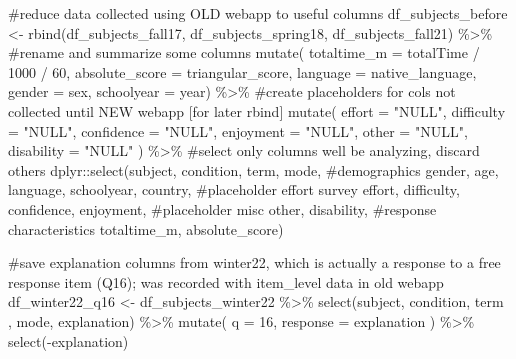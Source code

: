 \documentclass[
  letterpaper,
  DIV=11,
  numbers=noendperiod]{scrreprt}
\newenvironment{Shaded}{\begin{snugshade}}{\end{snugshade}}
\newcommand{\AttributeTok}[1]{\textcolor[rgb]{0.40,0.45,0.13}{#1}}
\newcommand{\CommentTok}[1]{\textcolor[rgb]{0.37,0.37,0.37}{#1}}
\newcommand{\DecValTok}[1]{\textcolor[rgb]{0.68,0.00,0.00}{#1}}
\newcommand{\FunctionTok}[1]{\textcolor[rgb]{0.28,0.35,0.67}{#1}}
\newcommand{\NormalTok}[1]{\textcolor[rgb]{0.00,0.23,0.31}{#1}}
\newcommand{\OtherTok}[1]{\textcolor[rgb]{0.00,0.23,0.31}{#1}}
\newcommand{\SpecialCharTok}[1]{\textcolor[rgb]{0.37,0.37,0.37}{#1}}
\newcommand{\StringTok}[1]{\textcolor[rgb]{0.13,0.47,0.30}{#1}}
\begin{document}
\begin{Shaded}
\begin{Highlighting}[]
\CommentTok{\#reduce data collected using OLD webapp to useful columns}
\NormalTok{df\_subjects\_before }\OtherTok{\textless{}{-}} \FunctionTok{rbind}\NormalTok{(df\_subjects\_fall17, df\_subjects\_spring18, df\_subjects\_fall21) }\SpecialCharTok{\%\textgreater{}\%} 
  \CommentTok{\#rename and summarize some columns}
  \FunctionTok{mutate}\NormalTok{(}
    \AttributeTok{totaltime\_m =}\NormalTok{ totalTime }\SpecialCharTok{/} \DecValTok{1000} \SpecialCharTok{/} \DecValTok{60}\NormalTok{,  }
    \AttributeTok{absolute\_score =}\NormalTok{ triangular\_score,}
    \AttributeTok{language =}\NormalTok{ native\_language,}
    \AttributeTok{gender =}\NormalTok{ sex,}
    \AttributeTok{schoolyear =}\NormalTok{ year) }\SpecialCharTok{\%\textgreater{}\%} 
  \CommentTok{\#create placeholders for cols not collected until NEW webapp [for later rbind]}
  \FunctionTok{mutate}\NormalTok{(}
    \AttributeTok{effort =} \StringTok{"NULL"}\NormalTok{,}
    \AttributeTok{difficulty =} \StringTok{"NULL"}\NormalTok{,}
    \AttributeTok{confidence =} \StringTok{"NULL"}\NormalTok{,}
    \AttributeTok{enjoyment =} \StringTok{"NULL"}\NormalTok{,}
    \AttributeTok{other =} \StringTok{"NULL"}\NormalTok{,}
    \AttributeTok{disability =} \StringTok{"NULL"}
\NormalTok{  ) }\SpecialCharTok{\%\textgreater{}\%} 
  \CommentTok{\#select only columns we\textquotesingle{}ll be analyzing, discard others}
\NormalTok{  dplyr}\SpecialCharTok{::}\FunctionTok{select}\NormalTok{(subject, condition, term, mode, }
                \CommentTok{\#demographics}
\NormalTok{                gender, age, language, schoolyear, country,}
                \CommentTok{\#placeholder effort survey}
\NormalTok{                effort, difficulty, confidence, enjoyment, }
                \CommentTok{\#placeholder misc }
\NormalTok{                other, disability,}
                \CommentTok{\#response characteristics}
\NormalTok{                totaltime\_m, absolute\_score)}

\CommentTok{\#save \textquotesingle{}explanation\textquotesingle{} columns from winter22, which is actually a response to a free response item (Q16); was recorded with item\_level data in old webapp}
\NormalTok{df\_winter22\_q16 }\OtherTok{\textless{}{-}}\NormalTok{ df\_subjects\_winter22 }\SpecialCharTok{\%\textgreater{}\%} 
  \FunctionTok{select}\NormalTok{(subject, condition, term , mode, explanation) }\SpecialCharTok{\%\textgreater{}\%} 
  \FunctionTok{mutate}\NormalTok{(}
    \AttributeTok{q =} \DecValTok{16}\NormalTok{,}
    \AttributeTok{response =}\NormalTok{ explanation}
\NormalTok{  ) }\SpecialCharTok{\%\textgreater{}\%} \FunctionTok{select}\NormalTok{(}\SpecialCharTok{{-}}\NormalTok{explanation)}


\end{Highlighting}
\end{Shaded}
\end{document}
